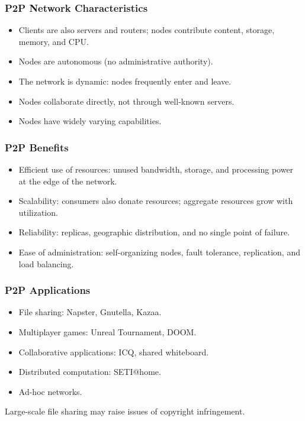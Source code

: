 \documentclass{article}
\begin{document}
\subsubsection{P2P Network Characteristics}
\begin{itemize}
    \item Clients are also servers and routers; nodes contribute content, storage, memory, and CPU.
    \item Nodes are autonomous (no administrative authority).
    \item The network is dynamic: nodes frequently enter and leave.
    \item Nodes collaborate directly, not through well-known servers.
    \item Nodes have widely varying capabilities.
\end{itemize}

\subsubsection{P2P Benefits}
\begin{itemize}
    \item Efficient use of resources: unused bandwidth, storage, and processing power at the edge of the network.
    \item Scalability: consumers also donate resources; aggregate resources grow with utilization.
    \item Reliability: replicas, geographic distribution, and no single point of failure.
    \item Ease of administration: self-organizing nodes, fault tolerance, replication, and load balancing.
\end{itemize}

\subsubsection{P2P Applications}
\begin{itemize}
    \item File sharing: Napster, Gnutella, Kazaa.
    \item Multiplayer games: Unreal Tournament, DOOM.
    \item Collaborative applications: ICQ, shared whiteboard.
    \item Distributed computation: SETI@home.
    \item Ad-hoc networks.
\end{itemize}

Large-scale file sharing may raise issues of copyright infringement.
\end{document}
